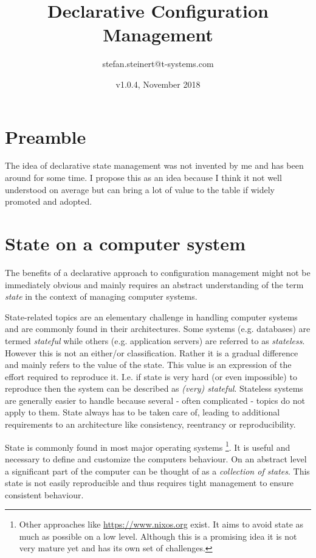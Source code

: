 \documentclass[12pt, a4paper]{article}
\title{Declarative Configuration Management}
\author{stefan.steinert@t-systems.com}
\date{v1.0.4, November 2018}
\begin{document}
\maketitle
\tableofcontents
\clearpage

\section{Preamble}
The idea of declarative state management was not invented by me and has been around for some time. I propose this as an idea because I think it not well understood on average but can bring a lot of value to the table if widely promoted and adopted.

\section{State on a computer system}
The benefits of a declarative approach to configuration management might not be immediately obvious and mainly requires an abstract understanding of the term \textit{state} in the context of managing computer systems.

State-related topics are an elementary challenge in handling computer systems and are commonly found in their architectures. Some systems (e.g. databases) are termed \textit{stateful} while others (e.g. application servers) are referred to as \textit{stateless}. However this is not an either/or classification. Rather it is a gradual difference and mainly refers to the value of the state. This value is an expression of the effort required to reproduce it. I.e. if state is very hard (or even impossible) to reproduce then the system can be described as \textit{(very) stateful}. Stateless systems are generally easier to handle because several - often complicated - topics do not apply to them. State always has to be taken care of, leading to additional requirements to an architecture like consistency, reentrancy or reproducibility.

State is commonly found in most major operating systems \footnote{Other approaches like \url{https://www.nixos.org} exist. It aims to avoid state as much as possible on a low level. Although this is a promising idea it is not very mature yet and has its own set of challenges.}. It is useful and necessary to define and customize the computers behaviour. On an abstract level a significant part of the computer can be thought of as a \textit{collection of states}. This state is not easily reproducible and thus requires tight management to ensure consistent behaviour.
\end{document}
